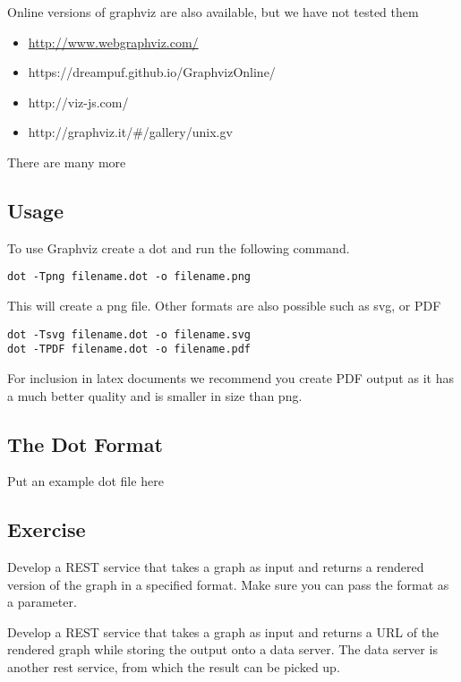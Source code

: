 Online versions of graphviz are also available, but we have not tested
them

\begin{itemize}
\item
  \url{http://www.webgraphviz.com/}
\item
  https://dreampuf.github.io/GraphvizOnline/
\item
  http://viz-js.com/
\item
  http://graphviz.it/\#/gallery/unix.gv
\end{itemize}

There are many more

\subsection{Usage}

To use Graphviz create a dot and run the following command.

\begin{lstlisting}
dot -Tpng filename.dot -o filename.png
\end{lstlisting}

This will create a png file. Other formats are also possible such as
svg, or PDF

\begin{lstlisting}
dot -Tsvg filename.dot -o filename.svg
dot -TPDF filename.dot -o filename.pdf
\end{lstlisting}

For inclusion in latex documents we recommend you create PDF output as it
has a much better quality and is smaller in size than png.

\subsection{The Dot Format}

Put an example dot file here

\subsection{Exercise}

\begin{exercise}
Develop a REST service that takes a graph as input and returns a rendered version of the graph in a specified format. Make sure you can pass the format as a parameter.
\end{exercise}

\begin{exercise}
Develop a REST service that takes a graph as input and returns a URL of the rendered graph while storing the output onto a data server. The data server is another rest service, from which the result can be picked up. 
\end{exercise}

